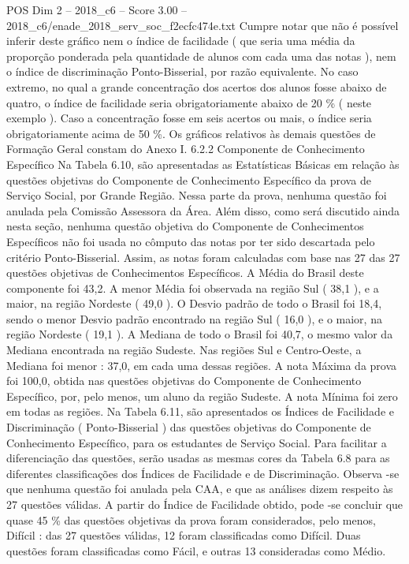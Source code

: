 \begin{textsample}{POS Dim 2 – 2018\_c6 – Score 3.00 – 2018\_c6/enade\_2018\_serv\_soc\_f2ecfc474e.txt}
Cumpre notar que não é possível inferir deste gráfico nem o índice de facilidade ( que seria uma média da proporção ponderada pela quantidade de alunos com cada uma das notas ), nem o índice de discriminação Ponto-Bisserial, por razão equivalente.
No caso extremo, no qual a grande concentração dos acertos dos alunos fosse abaixo de quatro, o índice de facilidade seria obrigatoriamente abaixo de 20 \% ( neste exemplo ).
Caso a concentração fosse em seis acertos ou mais, o índice seria obrigatoriamente acima de 50 \%.
Os gráficos relativos às demais questões de Formação Geral constam do Anexo I. 6.2.2 Componente de Conhecimento Específico Na Tabela 6.10, são apresentadas as Estatísticas Básicas em relação às questões objetivas do Componente de Conhecimento Específico da prova de Serviço Social, por Grande Região.
Nessa parte da prova, nenhuma questão foi anulada pela Comissão Assessora da Área.
Além disso, como será discutido ainda nesta seção, nenhuma questão objetiva do Componente de Conhecimentos Específicos não foi usada no cômputo das notas por ter sido descartada pelo critério Ponto-Bisserial.
Assim, as notas foram calculadas com base nas 27 das 27 questões objetivas de Conhecimentos Específicos.
A Média do Brasil deste componente foi 43,2.
A menor Média foi observada na região Sul ( 38,1 ), e a maior, na região Nordeste ( 49,0 ).
O Desvio padrão de todo o Brasil foi 18,4, sendo o menor Desvio padrão encontrado na região Sul ( 16,0 ), e o maior, na região Nordeste ( 19,1 ).
A Mediana de todo o Brasil foi 40,7, o mesmo valor da Mediana encontrada na região Sudeste.
Nas regiões Sul e Centro-Oeste, a Mediana foi menor : 37,0, em cada uma dessas regiões.
A nota Máxima da prova foi 100,0, obtida nas questões objetivas do Componente de Conhecimento Específico, por, pelo menos, um aluno da região Sudeste.
A nota Mínima foi zero em todas as regiões.
Na Tabela 6.11, são apresentados os Índices de Facilidade e Discriminação ( Ponto-Bisserial ) das questões objetivas do Componente de Conhecimento Específico, para os estudantes de Serviço Social.
Para facilitar a diferenciação das questões, serão usadas as mesmas cores da Tabela 6.8 para as diferentes classificações dos Índices de Facilidade e de Discriminação.
Observa -se que nenhuma questão foi anulada pela CAA, e que as análises dizem respeito às 27 questões válidas.
A partir do Índice de Facilidade obtido, pode -se concluir que quase 45 \% das questões objetivas da prova foram considerados, pelo menos, Difícil : das 27 questões válidas, 12 foram classificadas como Difícil.
Duas questões foram classificadas como Fácil, e outras 13 consideradas como Médio.

\end{textsample}
